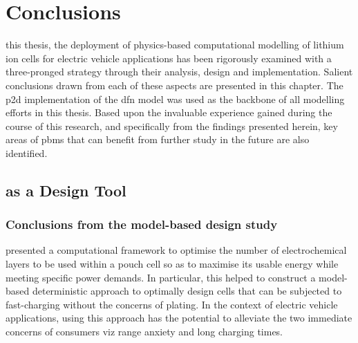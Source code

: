 
\graphicspath{{chapters/litt_review/figures/}}

\clearpage
\chapter{Conclusions}\label{ch:conclusions}
\startcontents[chapters]

\bigskip

 this  thesis, the  deployment of  physics-based computational
modelling  of lithium  ion  cells  for electric  vehicle  applications has  been
rigorously examined with a three-pronged strategy \viz{} through their analysis,
design and implementation. Salient conclusions  drawn from each of these aspects
are presented  in this  chapter. The \gls{p2d}  implementation of  the \gls{dfn}
model was used  as the backbone of  all modelling efforts in  this thesis. Based
upon the  invaluable experience gained during  the course of this  research, and
specifically from the  findings presented herein, key areas  of \glspl{pbm} that
can benefit from further study in the future are also identified.


\section{ as a Design Tool}

\subsection{Conclusions from the model-based design study}\label{sec:modelbasedconclusion}

 presented  a computational framework to  optimise the
number  of electrochemical  layers to  be  used within  a  pouch cell  so as  to
maximise its usable energy while  meeting specific power demands. In particular,
this  helped to  construct  a model-based  deterministic  approach to  optimally
design cells  that can  be subjected  to fast-charging  without the  concerns of
plating. In  the context of  electric vehicle applications, using  this approach
has the  potential to alleviate  the two  immediate concerns of  consumers viz{}
range anxiety and long charging times.

